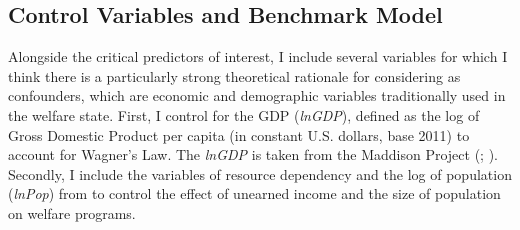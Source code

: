 \documentclass[11pt, notitlepage]{article}
\begin{document}

\subsection{Control Variables and Benchmark Model}

Alongside the critical predictors of interest, I include several variables for which I think there is a particularly strong theoretical rationale for considering as confounders, which are economic and demographic variables traditionally used in the welfare state.  First, I control for the GDP (\textit{lnGDP}), defined as the log of Gross Domestic Product per capita (in constant U.S. dollars, base 2011) to account for Wagner’s Law. The \textit{lnGDP} is taken from the Maddison Project (\citealp{Bolt2014}; \citealp[14]{Rasmussen2019}). Secondly, I include the variables of resource dependency and the log of population (\textit{lnPop}) from \citet{Miller2015a} to control the effect of unearned income and the size of population on welfare programs.


\par



\end{document}
